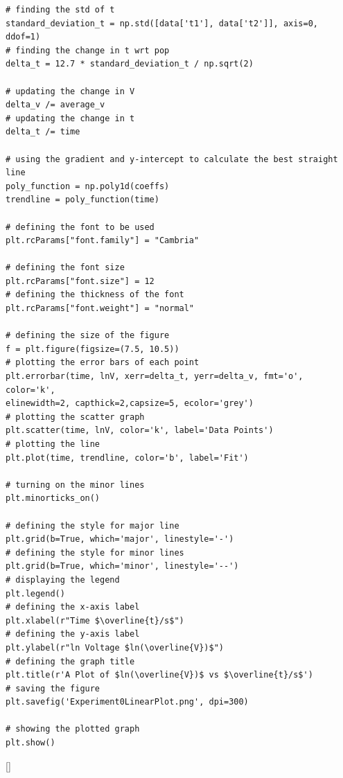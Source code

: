 \documentclass[12pt, a4paper]{article}
\begin{document}
\begin{verbatim}
# finding the std of t 
standard_deviation_t = np.std([data['t1'], data['t2']], axis=0, ddof=1)
# finding the change in t wrt pop
delta_t = 12.7 * standard_deviation_t / np.sqrt(2)

# updating the change in V
delta_v /= average_v
# updating the change in t
delta_t /= time

# using the gradient and y-intercept to calculate the best straight line 
poly_function = np.poly1d(coeffs)
trendline = poly_function(time)

# defining the font to be used 
plt.rcParams["font.family"] = "Cambria"

# defining the font size
plt.rcParams["font.size"] = 12 
# defining the thickness of the font
plt.rcParams["font.weight"] = "normal"

# defining the size of the figure
f = plt.figure(figsize=(7.5, 10.5))
# plotting the error bars of each point
plt.errorbar(time, lnV, xerr=delta_t, yerr=delta_v, fmt='o', color='k', 
elinewidth=2, capthick=2,capsize=5, ecolor='grey')
# plotting the scatter graph
plt.scatter(time, lnV, color='k', label='Data Points')  
# plotting the line
plt.plot(time, trendline, color='b', label='Fit')

# turning on the minor lines 
plt.minorticks_on() 

# defining the style for major line
plt.grid(b=True, which='major', linestyle='-')     
# defining the style for minor lines
plt.grid(b=True, which='minor', linestyle='--')    
# displaying the legend
plt.legend()                                       
# defining the x-axis label
plt.xlabel(r"Time $\overline{t}/s$")                          
# defining the y-axis label
plt.ylabel(r"ln Voltage $ln(\overline{V})$")                  
# defining the graph title
plt.title(r'A Plot of $ln(\overline{V})$ vs $\overline{t}/s$') 
# saving the figure
plt.savefig('Experiment0LinearPlot.png', dpi=300)      

# showing the plotted graph 
plt.show()                                         

\end{verbatim}[\fontsize{12pt}{12pt}]
\end{document}

